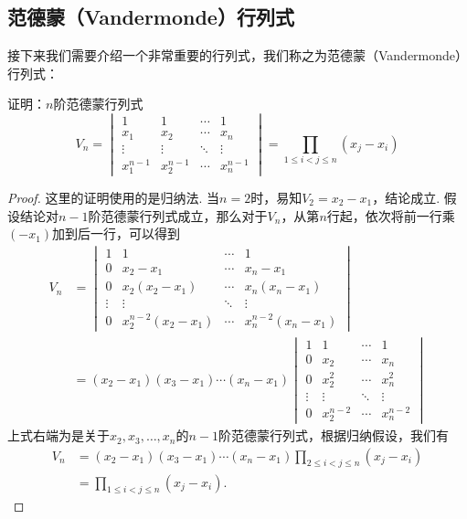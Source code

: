 \subsection{范德蒙（Vandermonde）行列式}
接下来我们需要介绍一个非常重要的行列式，我们称之为范德蒙（Vandermonde）行列式：
\begin{example}{}{}
    证明：$n$阶范德蒙行列式
    \[V_n=\begin{vmatrix}
            1         & 1         & \cdots & 1         \\
            x_1       & x_2       & \cdots & x_n       \\
            \vdots    & \vdots    & \ddots & \vdots    \\
            x_1^{n-1} & x_2^{n-1} & \cdots & x_n^{n-1}
        \end{vmatrix}=\prod_{1 \leqslant i < j \leqslant n}(x_j-x_i)\]
\end{example}

\begin{proof}
    这里的证明使用的是归纳法. 当$n=2$时，易知$V_2=x_2-x_1$，结论成立. 假设结论对$n-1$阶范德蒙行列式成立，那么对于$V_n$，从第$n$行起，依次将前一行乘$(-x_1)$加到后一行，可以得到\begin{align*}
        V_n & = \begin{vmatrix}
            1         & 1         & \cdots & 1         \\
            0         & x_2-x_1   & \cdots & x_n-x_1   \\
            0         & x_2(x_2-x_1) & \cdots & x_n(x_n-x_1) \\
            \vdots    & \vdots    & \ddots & \vdots    \\
            0         & x_2^{n-2}(x_2-x_1) & \cdots & x_n^{n-2}(x_n-x_1)
        \end{vmatrix} \\
        & = (x_2-x_1)(x_3-x_1)\cdots(x_n-x_1)\begin{vmatrix}
            1         & 1         & \cdots & 1         \\
            0         & x_2       & \cdots & x_n       \\
            0         & x_2^2     & \cdots & x_n^2     \\
            \vdots    & \vdots    & \ddots & \vdots    \\
            0         & x_2^{n-2} & \cdots & x_n^{n-2}
        \end{vmatrix}
    \end{align*}
    上式右端为是关于$x_2,x_3,\ldots,x_n$的$n-1$阶范德蒙行列式，根据归纳假设，我们有
    \begin{align*}
        V_n & = (x_2-x_1)(x_3-x_1)\cdots(x_n-x_1)\prod_{2 \leqslant i < j \leqslant n}(x_j-x_i) \\
            & = \prod_{1 \leqslant i < j \leqslant n}(x_j-x_i).
    \end{align*}
\end{proof}

